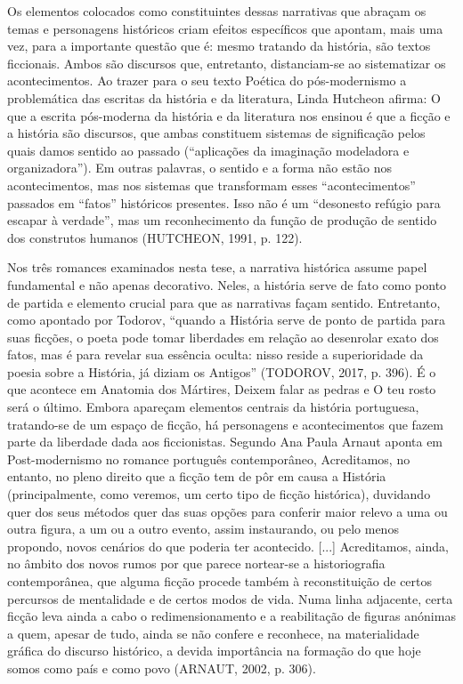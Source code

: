 \documentclass[../DISSERTACAO_MAIN.tex]{subfiles}
\begin{document}
Os elementos colocados como constituintes dessas narrativas que abraçam os temas e personagens históricos criam efeitos específicos que apontam, mais uma vez, para a importante questão que é: mesmo tratando da história, são textos ficcionais. Ambos são discursos que, entretanto, distanciam-se ao sistematizar os acontecimentos. Ao trazer para o seu texto Poética do pós-modernismo a problemática das escritas da história e da literatura,  Linda Hutcheon afirma:
O que a escrita pós-moderna da história e da literatura nos ensinou é que a ficção e a história são discursos, que ambas constituem sistemas de significação pelos quais damos sentido ao passado (“aplicações da imaginação modeladora e organizadora”). Em outras palavras, o sentido e a forma não estão nos acontecimentos, mas nos sistemas que transformam esses “acontecimentos” passados em “fatos” históricos presentes. Isso não é um “desonesto refúgio para escapar à verdade”, mas um reconhecimento da função de produção de sentido dos construtos humanos (HUTCHEON, 1991, p. 122).

Nos três romances examinados nesta tese, a narrativa histórica assume papel fundamental e não apenas decorativo. Neles, a história serve de fato como ponto de partida e elemento crucial para que as narrativas façam sentido. Entretanto, como apontado por Todorov, “quando a História serve de ponto de partida para suas ficções, o poeta pode tomar liberdades em relação ao desenrolar exato dos fatos, mas é para revelar sua essência oculta: nisso reside a superioridade da poesia sobre a História, já diziam os Antigos” (TODOROV, 2017, p. 396). É o que acontece em Anatomia dos Mártires, Deixem falar as pedras e O teu rosto será o último. Embora apareçam elementos centrais da história portuguesa, tratando-se de um espaço de ficção, há personagens e acontecimentos que fazem parte da liberdade dada aos ficcionistas. Segundo Ana Paula Arnaut aponta em Post-modernismo no romance português contemporâneo, 
Acreditamos, no entanto, no pleno direito que a ficção tem de pôr em causa a História (principalmente, como veremos, um certo tipo de ficção histórica), duvidando quer dos seus métodos quer das suas opções para conferir maior relevo a uma ou outra figura, a um ou a outro evento, assim instaurando, ou pelo menos propondo, novos cenários do que poderia ter acontecido. [...] Acreditamos, ainda, no âmbito dos novos rumos por que parece nortear-se a historiografia contemporânea, que alguma ficção procede também à reconstituição de certos percursos de mentalidade e de certos modos de vida. Numa linha adjacente, certa ficção leva ainda a cabo o redimensionamento e a reabilitação de figuras anónimas a quem, apesar de tudo, ainda se não confere e reconhece, na materialidade gráfica do discurso histórico, a devida importância na formação do que hoje somos como país e como povo (ARNAUT, 2002, p. 306).
\end{document}
